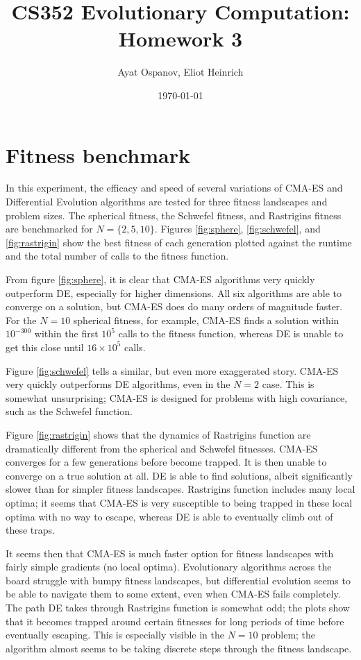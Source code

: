 \documentclass[12pt]{article}
\title{CS352 Evolutionary Computation: Homework 3}
\author{Ayat Ospanov, Eliot Heinrich}
\date{\today}
\begin{document}
\maketitle

\section{Fitness benchmark}

In this experiment, the efficacy and speed of several variations of CMA-ES and Differential Evolution algorithms are tested for three fitness landscapes and problem sizes. The spherical fitness, the Schwefel fitness, and Rastrigins fitness are benchmarked for $N=\{2,5,10\}$. Figures \ref{fig:sphere}, \ref{fig:schwefel}, and \ref{fig:rastrigin} show the best fitness of each generation plotted against the runtime and the total number of calls to the fitness function. 

From figure \ref{fig:sphere}, it is clear that CMA-ES algorithms very quickly outperform DE, especially for higher dimensions. All six algorithms are able to converge on a solution, but CMA-ES does do many orders of magnitude faster. For the $N=10$ spherical fitness, for example, CMA-ES finds a solution within $10^{-300}$ within the first $10^5$ calls to the fitness function, whereas DE is unable to get this close until $16 \times 10^{5}$ calls.

Figure \ref{fig:schwefel} tells a similar, but even more exaggerated story. CMA-ES very quickly outperforms DE algorithms, even in the $N=2$ case. This is somewhat unsurprising; CMA-ES is designed for problems with high covariance, such as the Schwefel function. 

Figure \ref{fig:rastrigin} shows that the dynamics of Rastrigins function are dramatically different from the spherical and Schwefel fitnesses. CMA-ES converges for a few generations before become trapped. It is then unable to converge on a true solution at all. DE is able to find solutions, albeit significantly slower than for simpler fitness landscapes. Rastrigins function includes many local optima; it seems that CMA-ES is very susceptible to being trapped in these local optima with no way to escape, whereas DE is able to eventually climb out of these traps. 

It seems then that CMA-ES is much faster option for fitness landscapes with fairly simple gradients (no local optima). Evolutionary algorithms across the board struggle with bumpy fitness landscapes, but differential evolution seems to be able to navigate them to some extent, even when CMA-ES fails completely. The path DE takes through Rastrigins function is somewhat odd; the plots show that it becomes trapped around certain fitnesses for long periods of time before eventually escaping. This is especially visible in the $N=10$ problem; the algorithm almost seems to be taking discrete steps through the fitness landscape.
\end{document}
